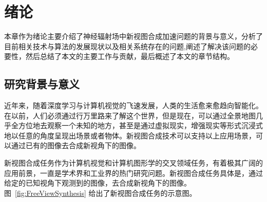 
\chapter{绪论}

本章作为绪论主要介绍了神经辐射场中新视图合成加速问题的背景与意义，分析了目前相关技术与算法的发展现状以及相关系统存在的问题,阐述了解决该问题的必要性，然后总结了本文的主要工作与贡献，最后概述了本文的章节结构。

\section{研究背景与意义}
近年来，随着深度学习与计算机视觉的飞速发展，人类的生活愈来愈趋向智能化。在以前，人们必须通过行万里路来了解这个世界，但是现在，可以通过全景地图几乎全方位地去观察一个未知的地方，甚至是通过虚拟现实，增强现实等形式沉浸式地以任意的角度呈现出场景或者物体。新视图合成技术可以支持以上应用场景，可以通过已有的图像去合成新视角下的图像。

新视图合成任务\cite{chen1993view}作为计算机视觉和计算机图形学的交叉领域任务，有着极其广阔的应用前景，一直是学术界和工业界的热门研究问题。新视图合成任务具体是，通过给定的已知视角下观测到的图像，去合成新视角下的图像。图~\ref{fig:FreeViewSynthesis} 给出了新视图合成任务的示意图。


